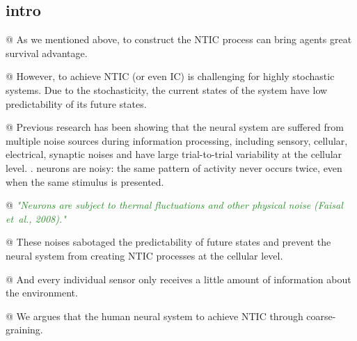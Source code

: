 \documentclass[utf8]{article}
\newenvironment{ants}
			{
			 \begin{easylist}[itemize]		
		 	}
			{
			\end{easylist}
			}
\newcommand{\rewrite}[1]{\textcolor{ForestGreen}{\textit{"#1"}}\newline}
\begin{document}
		\subsection{intro}
			\begin{ants}
				@ As we mentioned above, to construct the NTIC process can bring agents great survival advantage.
				
				@ However, to achieve NTIC (or even IC) is challenging for highly stochastic systems. Due to the stochasticity, the current states of the system have low predictability of its future states. 
				
				@ Previous research has been showing that the neural system are suffered from multiple noise sources  during information processing, including sensory, cellular, electrical, synaptic noises and have large trial-to-trial variability at the cellular level. \citep{faisal2008noise}. neurons are noisy: the same pattern of activity never occurs twice, even when the same stimulus is presented.
				
				@ \rewrite{Neurons are subject to thermal fluctuations and other physical noise (Faisal et al., 2008).} \cite{faisal2008noise}					
				
	
				@ These noises sabotaged the predictability of future states and prevent the neural system from creating NTIC processes at the cellular level. 
				
				@ And every individual sensor only receives a little amount of information about the environment.			
				
				@ We argues that the human neural system to achieve NTIC through coarse-graining. 
			\end{ants}
	
	
	
	
	
\end{document}
